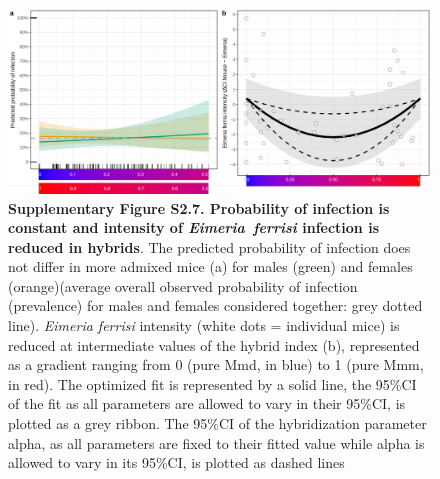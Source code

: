 \begin{figure}[H]
	\centering
	\includegraphics[width=\linewidth,height=\textheight,keepaspectratio]{images/2article1/SupplementaryFigureS7.pdf}
	\captionsetup{labelformat=empty}
	\caption{\textbf{Supplementary Figure S2.7. Probability of infection is constant and intensity of \textit{Eimeria~ferrisi} infection is reduced in hybrids}. The predicted probability of infection does not differ in more admixed mice (a) for males (green) and females (orange)(average overall observed probability of infection (prevalence) for males and females considered together: grey dotted line). \textit{Eimeria ferrisi} intensity (white dots = individual mice) is reduced at intermediate values of the hybrid index (b), represented as a gradient ranging from 0 (pure Mmd, in blue) to 1 (pure Mmm, in red). The optimized fit is represented by a solid line, the 95\%CI of the fit as all parameters are allowed to vary in their 95\%CI, is plotted as a grey ribbon. The 95\%CI of the hybridization parameter alpha, as all parameters
are fixed to their fitted value while alpha is allowed to vary in its 95\%CI, is plotted as dashed lines}
\end{figure}

